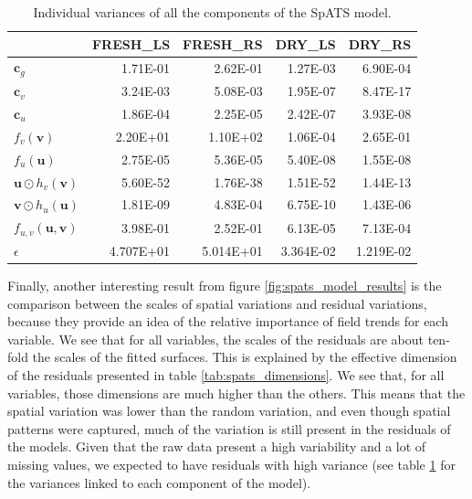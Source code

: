 \begin{table}[ht]
\centering
{}
\caption{Individual variances of all the components of the SpATS model.} 
\begin{tabular}{lrrrr}
  \toprule
 & FRESH\_LS & FRESH\_RS & DRY\_LS & DRY\_RS \\ 
  \midrule
$\mathbf{c}_{g}$ & 1.71E-01 & 2.62E-01 & 1.27E-03 & 6.90E-04 \\ 
  $\mathbf{c}_{v}$ & 3.24E-03 & 5.08E-03 & 1.95E-07 & 8.47E-17 \\ 
  $\mathbf{c}_{u}$ & 1.86E-04 & 2.25E-05 & 2.42E-07 & 3.93E-08 \\ 
  $f_{v}(\mathbf{v})$ & 2.20E+01 & 1.10E+02 & 1.06E-04 & 2.65E-01 \\ 
  $f_{u}(\mathbf{u})$ & 2.75E-05 & 5.36E-05 & 5.40E-08 & 1.55E-08 \\ 
  $\boldsymbol{u} \odot h_{v}(\boldsymbol{v})$ & 5.60E-52 & 1.76E-38 & 1.51E-52 & 1.44E-13 \\ 
  $\boldsymbol{v} \odot h_{u}(\boldsymbol{u})$ & 1.81E-09 & 4.83E-04 & 6.75E-10 & 1.43E-06 \\ 
  $f_{u, v}(\boldsymbol{u}, \boldsymbol{v})$ & 3.98E-01 & 2.52E-01 & 6.13E-05 & 7.13E-04 \\ 
  $\epsilon$ & 4.707E+01 & 5.014E+01 & 3.364E-02 & 1.219E-02\\
   \bottomrule
\end{tabular}
\label{tab:spats_variances}
\end{table}

Finally, another interesting result from figure \ref{fig:spats_model_results} is the comparison between the scales of spatial variations and residual variations, because they provide an idea of the relative importance of field trends for each variable. We see that for all variables, the scales of the residuals are about ten-fold the scales of the fitted surfaces. This is explained by the effective dimension of the residuals presented in table \ref{tab:spats_dimensions}. We see that, for all variables, those dimensions are much higher than the others. This means that the spatial variation was lower than the random variation, and even though spatial patterns were captured, much of the variation is still present in the residuals of the models. Given that the raw data present a high variability and a lot of missing values, we expected to have residuals with high variance (see table \ref{tab:spats_variances} for the variances linked to each component of the model).

